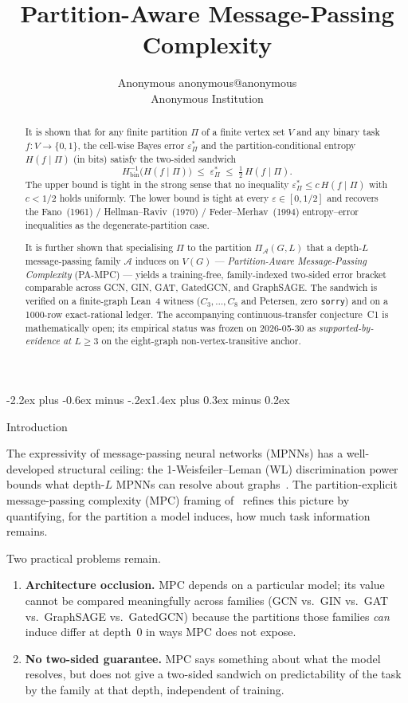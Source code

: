 \documentclass[10pt]{article}
\title{Partition-Aware Message-Passing Complexity}
\author{\name Anonymous \email anonymous@anonymous \\
        \addr Anonymous Institution}
\makeatletter
\def\section{\@startsection{section}{1}{\z@}%
  {-2.2ex plus -0.6ex minus -.2ex}{1.4ex plus 0.3ex minus 0.2ex}%
  {\normalsize\bf\raggedright\sffamily}}
\theoremstyle{definition}
\theoremstyle{remark}
\newcommand{\Hbin}{H_{\mathrm{bin}}}
\newcommand{\eps}{\varepsilon}
\newcommand{\epsP}{\eps^{*}_{\Pi}}
\newcommand{\PiA}{\Pi_{\mathcal{A}}}
\makeatother
\begin{document}
\maketitle

\begin{abstract}
It is shown that for any finite partition $\Pi$ of a finite vertex
set $V$ and any binary task $f : V \to \{0,1\}$, the cell-wise Bayes
error $\epsP$ and the partition-conditional entropy $H(f \mid \Pi)$
(in bits) satisfy the two-sided sandwich
$$
  \Hbin^{-1}\bigl(H(f \mid \Pi)\bigr) \;\le\; \epsP \;\le\; \tfrac{1}{2}\,H(f \mid \Pi).
$$
The upper bound is tight in the strong sense that no inequality
$\epsP \le c\,H(f \mid \Pi)$ with $c < 1/2$ holds uniformly.
The lower bound is tight at every $\eps \in [0, 1/2]$ and recovers the
Fano~(1961) / Hellman--Raviv~(1970) / Feder--Merhav~(1994)
entropy--error inequalities as the degenerate-partition case.

It is further shown that specialising $\Pi$ to the partition
$\PiA(G, L)$ that a depth-$L$ message-passing family $\mathcal{A}$
induces on $V(G)$ --- \emph{Partition-Aware Message-Passing
Complexity} (PA-MPC) --- yields a training-free, family-indexed
two-sided error bracket comparable across GCN, GIN, GAT, GatedGCN,
and GraphSAGE. The sandwich is verified on a finite-graph Lean~4
witness ($C_3,\ldots,C_8$ and Petersen, zero \texttt{sorry}) and on
a 1000-row exact-rational ledger. The accompanying
continuous-transfer conjecture~C1 is mathematically open; its
empirical status was frozen on 2026-05-30 as
\emph{supported-by-evidence at $L \ge 3$} on the eight-graph
non-vertex-transitive anchor.
\end{abstract}

\section{Introduction}

The expressivity of message-passing neural networks (MPNNs) has a
well-developed structural ceiling: the 1-Weisfeiler--Leman (WL)
discrimination power bounds what depth-$L$ MPNNs can resolve about
graphs~\citep{xu2019gin,morris2019wl}.
The partition-explicit message-passing complexity (MPC) framing
of~\citet{kemper2025mpc} refines this picture by quantifying, for the
partition a model induces, how much task information remains.

Two practical problems remain.
\begin{enumerate}
  \item \textbf{Architecture occlusion.} MPC depends on a particular
    model; its value cannot be compared meaningfully across families
    (GCN vs.\ GIN vs.\ GAT vs.\ GraphSAGE vs.\ GatedGCN) because the
    partitions those families \emph{can} induce differ at depth~0 in
    ways MPC does not expose.
  \item \textbf{No two-sided guarantee.} MPC says something about
    what the model resolves, but does not give a two-sided sandwich
    on predictability of the task by the family at that depth,
    independent of training.
\end{enumerate}
\end{document}
